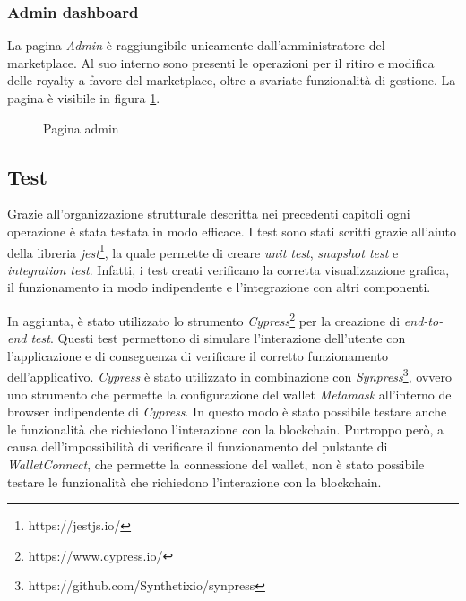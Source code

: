 \subsubsection{Admin dashboard}
\label{sec:admin-dashboard}

La pagina \textit{Admin} è raggiungibile unicamente dall'amministratore del marketplace. Al suo interno sono presenti le operazioni per il ritiro e modifica delle royalty a favore del marketplace, oltre a svariate funzionalità di gestione. La pagina è visibile in figura \ref{fig:admin}.

\begin{figure}[H]
    \centering
    \caption{Pagina admin}
    \label{fig:admin}
\end{figure}

\subsection{Test}

Grazie all'organizzazione strutturale descritta nei precedenti capitoli ogni operazione è stata testata in modo efficace. I test sono stati scritti grazie all'aiuto della libreria \textit{jest}\footnote{https://jestjs.io/}, la quale permette di creare \textit{unit test}, \textit{snapshot test} e \textit{integration test}. Infatti, i test creati verificano la corretta visualizzazione grafica, il funzionamento in modo indipendente e l'integrazione con altri componenti.

In aggiunta, è stato utilizzato lo strumento \textit{Cypress}\footnote{https://www.cypress.io/} per la creazione di \textit{end-to-end test}. Questi test permettono di simulare l'interazione dell'utente con l'applicazione e di conseguenza di verificare il corretto funzionamento dell'applicativo. \textit{Cypress} è stato utilizzato in combinazione con \textit{Synpress}\footnote{https://github.com/Synthetixio/synpress}, ovvero uno strumento che permette la configurazione del wallet \textit{Metamask} all'interno del browser indipendente di \textit{Cypress}. In questo modo è stato possibile testare anche le funzionalità che richiedono l'interazione con la blockchain. Purtroppo però, a causa dell'impossibilità di verificare il funzionamento del pulstante di \textit{WalletConnect}, che permette la connessione del wallet, non è stato possibile testare le funzionalità che richiedono l'interazione con la blockchain. 

